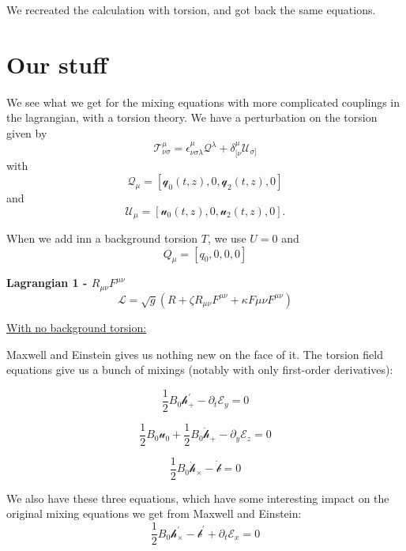 \documentclass[letterpaper,12pt]{article}
\begin{document}
We recreated the calculation with torsion, and got back the same equations.
\section{Our stuff}

We see what we get for the mixing equations with more complicated couplings in the lagrangian, with a torsion theory. We have a perturbation on the torsion given by 
\begin{equation}
\mathcal{T}^{\mu}_{\nu \sigma}=\epsilon^{\mu}_{\nu \sigma \lambda} \mathcal{Q}^{\lambda}+\delta^{\mu}_{[\nu} \mathcal{U}_{\sigma]}
\end{equation}
with
\begin{equation}
\mathcal{Q}_{\mu}=[\mathcal{q}_0(t,z),0,\mathcal{q}_2(t,z),0]
\end{equation}
and
\begin{equation}
\mathcal{U}_{\mu}=[\mathcal{u}_0(t,z),0,\mathcal{u}_2(t,z),0].
\end{equation}

When we add inn a background torsion $T$, we use $U=0$ and 
\begin{equation}
Q_{\mu}=[q_0,0,0,0]
\end{equation}


\textbf{Lagrangian 1 - $R_{\mu \nu} F^{\mu \nu}$}
\begin{equation}
\mathcal{L}=\sqrt{g}(R+\zeta R_{\mu \nu} F^{\mu \nu}+\kappa F{\mu \nu}F^{\mu \nu})
\end{equation}

\underline{With no background torsion:}

Maxwell and Einstein gives us nothing new on the face of it. The torsion field equations give us a bunch of mixings (notably with only first-order derivatives):

\begin{equation}
\frac{1}{2}  B_0 \mathcal{h}_{+}^{'} -  \partial_{t}\mathcal{E}_y=0
\end{equation}

\begin{equation}
\frac{1}{2} B_0 \mathcal{u}_0 + \frac{1}{2} B_0 \dot{\mathcal{h}}_{+}-\partial_{y} \mathcal{E}_z=0
\end{equation}

\begin{equation}
\frac{1}{2} B_0 \dot{\mathcal{h}}_{\times} - \dot{\mathcal{b}}=0
\end{equation}

We also have these three equations, which have some interesting impact on the original mixing equations we get from Maxwell and Einstein:
\begin{equation}
\frac{1}{2} B_0 \mathcal{h}_{\times}^{'}-\mathcal{b}^{'}+\partial_t \mathcal{E}_x=0
\end{equation}
\end{document}
